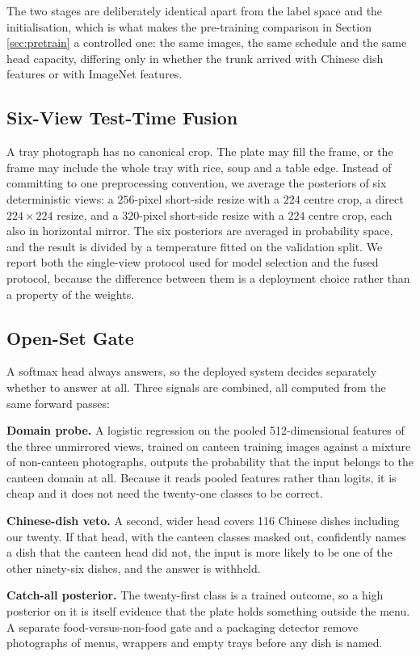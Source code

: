 \documentclass[conference]{IEEEtran}
\begin{document}
The two stages are deliberately identical apart from the label space and the
initialisation, which is what makes the pre-training comparison in
Section \ref{sec:pretrain} a controlled one: the same images, the same schedule
and the same head capacity, differing only in whether the trunk arrived with
Chinese dish features or with ImageNet features.

\subsection{Six-View Test-Time Fusion}
A tray photograph has no canonical crop. The plate may fill the frame, or the
frame may include the whole tray with rice, soup and a table edge. Instead of
committing to one preprocessing convention, we average the posteriors of six
deterministic views: a $256$-pixel short-side resize with a $224$ centre crop, a
direct $224\times224$ resize, and a $320$-pixel short-side resize with a $224$
centre crop, each also in horizontal mirror. The six posteriors are averaged in
probability space, and the result is divided by a temperature fitted on the
validation split. We report both the single-view protocol used for model
selection and the fused protocol, because the difference between them is a
deployment choice rather than a property of the weights.

\subsection{Open-Set Gate}
\label{sec:gate}
A softmax head always answers, so the deployed system decides separately whether
to answer at all. Three signals are combined, all computed from the same forward
passes:

\textbf{Domain probe.} A logistic regression on the pooled 512-dimensional
features of the three unmirrored views, trained on canteen training images
against a mixture of non-canteen photographs, outputs the probability that the
input belongs to the canteen domain at all. Because it reads pooled features
rather than logits, it is cheap and it does not need the twenty-one classes to be
correct.

\textbf{Chinese-dish veto.} A second, wider head covers 116 Chinese dishes
including our twenty. If that head, with the canteen classes masked out,
confidently names a dish that the canteen head did not, the input is more likely
to be one of the other ninety-six dishes, and the answer is withheld.

\textbf{Catch-all posterior.} The twenty-first class is a trained outcome, so a
high posterior on it is itself evidence that the plate holds something outside
the menu. A separate food-versus-non-food gate and a packaging detector remove
photographs of menus, wrappers and empty trays before any dish is named.
\end{document}
